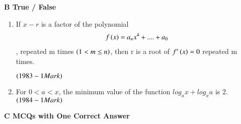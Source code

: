 \documentclass[journal,12pt,twocolumn]{IEEEtran}
\theoremstyle{remark}
\begin{document}
\textbf{B True / False}\\

\begin{enumerate}

	\item If $x-r$ is a factor of the polynomial
		\begin{align*}f\left(x\right) = a_nx^4+....+a_0\end{align*},
repeated m times $\left(1< m\leq n\right)$, then r is a root of 
$f'\left(x\right)=0$ repeated m times.

\hfill$\left(1983 - 1 Mark\right)$\\

         \item For $0 < a < x$, the minimum value of the function 
$log_a x + log_x a$ is $2$. \hfill$\left(1984 - 1 Mark\right)$\\

\end{enumerate}

\textbf{C MCQs with One Correct Answer}\\
\end{document}
